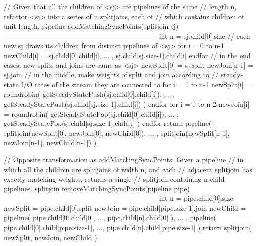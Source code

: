 // Given that all the children of <sj> are pipelines of the same
// length n, refactor <sj> into a series of n splitjoins, each of
// which contains children of unit length.
pipeline addMatchingSyncPoints(splitjoin sj)
------------------------------------------------------------------
int n = sj.child[0].size
// each new sj draws its children from distinct pipelines of <sj>
for i = 0 to n-1
  newChild[i] = { sj.child[0].child[i], ... , 
                  sj.child[sj.size-1].child[i] }
endfor
// in the end cases, new splits and joins are same as <sj>
newSplit[0] = sj.split
newJoin[n-1] = sj.join
// in the middle, make weights of split and join according to
// steady-state I/O rates of the stream they are connected to
for i = 1 to n-1
  newSplit[i] = roundrobin( getSteadyStatePush(sj.child[0].child[i]), 
                  ... ,
                  getSteadyStatePush(sj.child[sj.size-1].child[i]) )
endfor
for i = 0 to n-2
  newJoin[i] = roundrobin( getSteadyStatePop(sj.child[0].child[i]), ... , 
                getSteadyStatePop(sj.child[sj.size-1].child[i] )
endfor
return pipeline( splitjoin(newSplit[0], newJoin[0], newChild[0]), ... ,
                 splitjoin(newSplit[n-1], newJoin[n-1], newChild[n-1]) )


// Opposite transformation as addMatchingSyncPoints.  Given a pipeline
// in which all the children are splitjoins of width n, and each
// adjacent splitjoin has exactly matching weights, returns a single
// splitjoin containing n child pipelines.
splitjoin removeMatchingSyncPoints(pipeline pipe)
------------------------------------------------------------------
int n = pipe.child[0].size
newSplit = pipe.child[0].split
newJoin = pipe.child[pipe.size-1].join
newChild = { pipeline( pipe.child[0].child[0], ..., 
             pipe.child[n].child[0] ),  ... ,
             pipeline( pipe.child[0].child[pipe.size-1], ..., 
             pipe.child[n].child[pipe.size-1] ) }
return splitjoin( newSplit, newJoin, newChild )